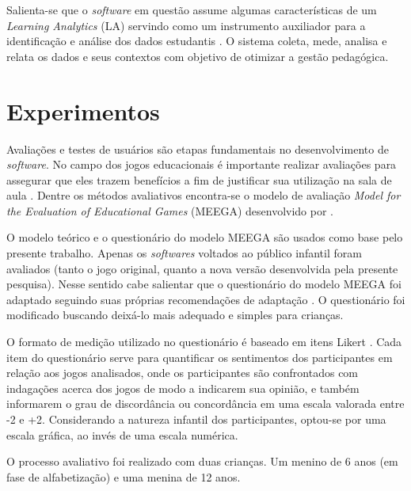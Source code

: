 \documentclass[alpha-refs,brazilian]{RBCA_v2.0}
\begin{document}
Salienta-se que o \textit{software} em questão assume algumas características de um \textit{Learning Analytics} (LA) servindo como um instrumento auxiliador para a identificação e análise dos dados estudantis \citep{prante2018professor}. O sistema coleta, mede, analisa e relata os dados e seus contextos com objetivo de otimizar a gestão pedagógica.

\section{Experimentos}\label{secao:Experimentos}

Avaliações e testes de usuários são etapas fundamentais no desenvolvimento de \textit{software}. No campo dos jogos educacionais é importante realizar avaliações para assegurar que eles trazem benefícios a fim de justificar sua utilização na sala de aula \citep{campos1996dez}. Dentre os métodos avaliativos encontra-se o modelo de avaliação \textit{Model for the Evaluation of Educational Games} (MEEGA) desenvolvido por \cite{savi2011avaliaccao}.

O modelo teórico e o questionário do modelo MEEGA são usados como base pelo presente trabalho. %
Apenas os \textit{softwares} voltados ao público infantil foram avaliados (tanto o jogo original, quanto a nova versão desenvolvida pela presente pesquisa). Nesse sentido cabe salientar que o questionário do modelo MEEGA foi adaptado seguindo suas próprias recomendações de adaptação \citep{savi2011model}. O questionário foi modificado buscando deixá-lo mais adequado e simples para crianças.%

O formato de medição utilizado no questionário é baseado em itens Likert \citep{likert1932technique}. Cada item do questionário serve para quantificar os sentimentos dos participantes em relação aos jogos analisados, onde os participantes são confrontados com indagações acerca dos jogos de modo a indicarem sua opinião, e também informarem o grau de discordância ou concordância em uma escala valorada entre -2 e +2. Considerando a natureza infantil dos participantes, optou-se por uma escala gráfica, ao invés de uma escala numérica.


O processo avaliativo foi realizado com duas crianças. Um menino de 6 anos (em fase de alfabetização) e uma menina de 12 anos.
\end{document}
